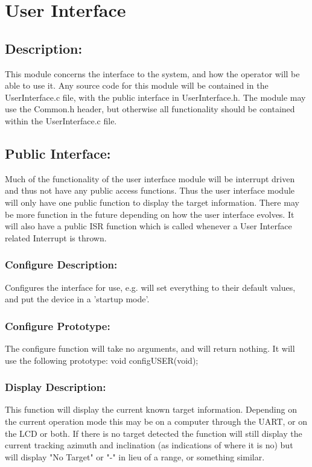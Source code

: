 \documentclass[]{article}
\begin{document}
\newpage
\section{User Interface}

\subsection{Description:}
This module concerns the interface to the system, and how the operator will be able to use it. Any source code for this module will be contained in the UserInterface.c file, with the public interface in UserInterface.h. The module may use the Common.h header, but otherwise all functionality should be contained within the UserInterface.c file.

\subsection{Public Interface:}
Much of the functionality of the user interface module will be interrupt driven and thus not have any public access functions. Thus the user interface module will only have one public function to display the target information. There may be more function in the future depending on how the user interface evolves. It will also have a public ISR function which is called whenever a User Interface related Interrupt is thrown.

\subsubsection{Configure Description:}
Configures the interface for use, e.g. will set everything to their default values, and put the device in a 'startup mode'.

\subsubsection{Configure Prototype:}
The configure function will take no arguments, and will return nothing. It will use the following prototype: \newline \newline
void configUSER(void);

\subsubsection{Display Description:}
This function will display the current known target information. Depending on the current operation mode this may be on a computer through the UART, or on the LCD or both. If there is no target detected the function will still display the current tracking azimuth and inclination (as indications of where it is no) but will display "No Target" or "-" in lieu of a range, or something similar.
\end{document}
